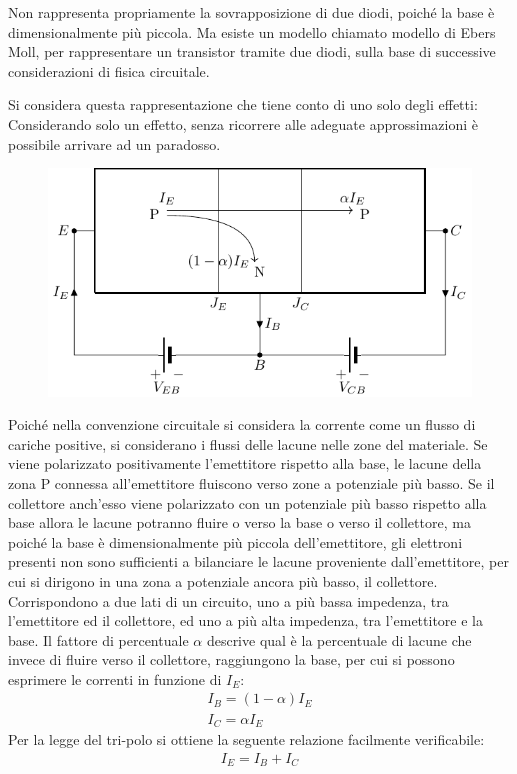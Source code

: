 \documentclass{article}
\numberwithin{equation}{subsection}
\begin{document}
Non rappresenta propriamente la sovrapposizione di due diodi, poiché la base è dimensionalmente più piccola. Ma esiste un modello chiamato modello di 
Ebers Moll, per rappresentare un transistor tramite due diodi, sulla base di successive considerazioni di fisica circuitale. 


Si considera questa rappresentazione che tiene conto di uno solo degli effetti:
Considerando solo un effetto, senza ricorrere alle adeguate approssimazioni è possibile arrivare ad un paradosso. 
\begin{figure}[H]%
    \centering
    \includegraphics{bjt-fisico.pdf}%
    \label{fig:bjt-fisico}
\end{figure}
Poiché nella convenzione circuitale si considera la corrente come un flusso di cariche positive, si considerano i flussi delle lacune nelle zone del materiale. 
Se viene polarizzato positivamente l'emettitore rispetto alla base, le lacune della zona P connessa all'emettitore fluiscono verso zone a potenziale più basso. Se il 
collettore anch'esso viene polarizzato con un potenziale più basso rispetto alla base allora le lacune potranno fluire o verso la base o verso il collettore, ma poiché 
la base è dimensionalmente più piccola dell'emettitore, gli elettroni presenti non sono sufficienti a bilanciare le lacune proveniente dall'emettitore, per cui 
si dirigono in una zona a potenziale ancora più basso, il collettore. 
Corrispondono a due lati di un circuito, uno a più bassa impedenza, tra l'emettitore ed il collettore, ed uno a più alta impedenza, tra l'emettitore e la base. 
Il fattore di percentuale $\alpha$ descrive qual è la percentuale di lacune che invece di fluire verso il collettore, raggiungono la base, per cui si possono 
esprimere le correnti in funzione di $I_E$:
\begin{gather*}
    I_B=(1-\alpha)I_E\\
    I_C=\alpha I_E
\end{gather*}
Per la legge del tri-polo si ottiene la seguente relazione facilmente verificabile:
\begin{gather*}
    I_E=I_B+I_C
\end{gather*}
\end{document}
